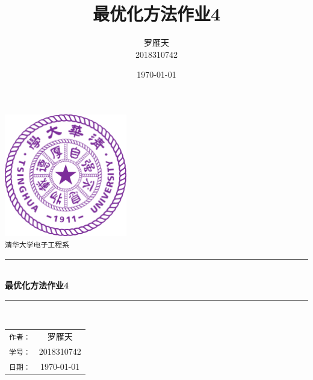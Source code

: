 \documentclass[a4paper]{article}
\title{最优化方法作业4}
\author{罗雁天 \\
2018310742}
\date{\today}
\begin{document}
\newcommand{\HRule}{\rule{\linewidth}{0.5mm}}
\begin{titlepage}
	\begin{center}
		\includegraphics[width=0.4\textwidth]{Tsinghua2.png}\\[1cm]
		\textsc{\Large \texttt{清华大学电子工程系}}\\[1cm]
		\HRule \\[1cm]
		{\Huge \bfseries 最优化方法作业4}\\[0.4cm]
		\HRule \\[3.5cm]
		\begin{minipage}{0.4\textwidth}
			\begin{center}
				\Large
				\begin{tabular}{cc}
					\texttt{作者：} & 罗雁天 \\[0.5cm]
					\texttt{学号：} & 2018310742 \\[0.5cm]
					\texttt{日期：} & \today
				\end{tabular}
			\end{center}
		\end{minipage}
		\vfill
	\end{center}
\end{titlepage}
\end{document}
